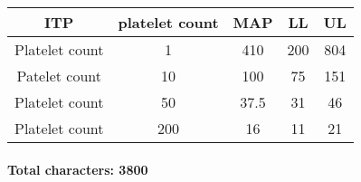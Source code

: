 \documentclass[11pt]{article}
\begin{document}
\begin{center}
 \begin{tabular}{||c c c c c||}
 \hline\hline
  ITP   & platelet count & MAP & LL & UL    \\
\hline\hline
 Platelet count & 1 & 410 & 200  & 804 \\
 \hline
 Patelet count & 10 & 100 &  75 & 151 \\
 \hline
 Platelet count & 50 & 37.5 & 31 & 46 \\
 \hline
 Platelet count & 200 & 16 & 11 & 21 \\ [1ex]
 \hline
\end{tabular}
\end{center}




\paragraph{}
\textbf{Total characters: 3800}
\end{document}
